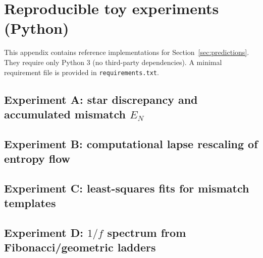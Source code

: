\section{Reproducible toy experiments (Python)}
\label{app:repro_code}

This appendix contains reference implementations for Section~\ref{sec:predictions}. They require only Python 3 (no third-party dependencies). A minimal requirement file is provided in \texttt{requirements.txt}.

\subsection{Experiment A: star discrepancy and accumulated mismatch \texorpdfstring{$E_N$}{EN}}

\subsection{Experiment B: computational lapse rescaling of entropy flow}

\subsection{Experiment C: least-squares fits for mismatch templates}

\subsection{Experiment D: \texorpdfstring{$1/f$}{1/f} spectrum from Fibonacci/geometric ladders}


